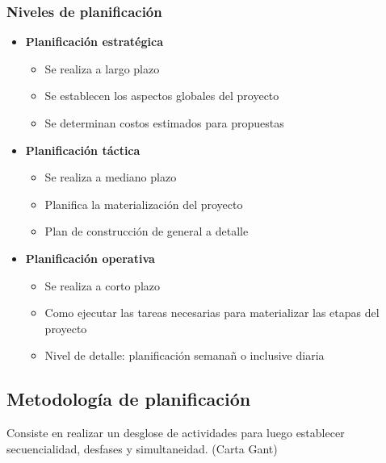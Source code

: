 \documentclass{article} %
\begin{document}
\subsubsection{Niveles de planificación}
\begin{itemize}
    \item \textbf{Planificación estratégica}
    \begin{itemize}
        \item Se realiza a largo plazo
        \item Se establecen los aspectos globales del proyecto
        \item Se determinan costos estimados para propuestas
    \end{itemize}
    \item \textbf{Planificación táctica}
    \begin{itemize}
        \item Se realiza a mediano plazo
        \item Planifica la materialización del proyecto
        \item Plan de construcción de general a detalle
    \end{itemize}
    \item \textbf{Planificación operativa}
    \begin{itemize}
        \item Se realiza a corto plazo
        \item Como ejecutar las tareas necesarias para materializar las etapas del proyecto
        \item Nivel de detalle: planificación semanañ o inclusive diaria
    \end{itemize}
\end{itemize}


\subsection{Metodología de planificación}
Consiste en realizar un desglose de actividades para luego establecer secuencialidad, desfases y simultaneidad. (Carta Gant)
\end{document}
